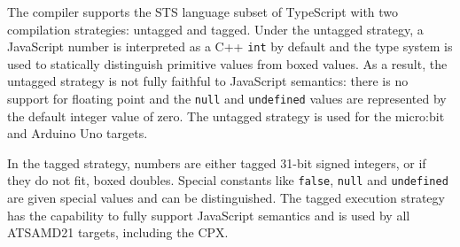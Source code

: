\label{sec:untagged-tagged}
The \MC compiler supports the STS language subset of TypeScript
with two compilation strategies: untagged and tagged. Under the untagged strategy,
a JavaScript number is interpreted as a C++ \texttt{int} by default and the type system is used
to statically distinguish primitive values from boxed values. As a result, the untagged
strategy is not fully faithful to JavaScript semantics: there is no support for floating
point and the \texttt{null} and \texttt{undefined} values are represented by the default integer value of zero. The untagged strategy is used for the micro:bit and Arduino Uno targets.

In the tagged strategy, numbers are either tagged 31-bit signed integers, or if they do not fit, boxed doubles. Special constants like \texttt{false}, \texttt{null} and \texttt{undefined} are given special values and can be distinguished. The tagged execution strategy has the capability to fully support JavaScript semantics and
is used by all ATSAMD21 targets, including the CPX.
